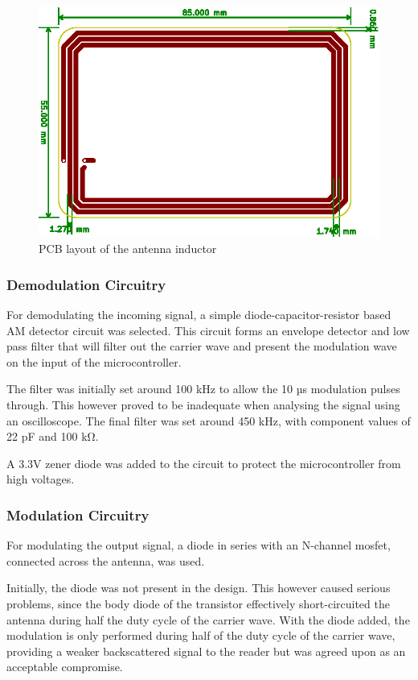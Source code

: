 \begin{figure}[h!]
    \centering
    \includegraphics[scale=1.0]{res/softtag-brd-antenna.eps}
    \caption{PCB layout of the antenna inductor}
    \label{fig:brd-antenna}
\end{figure}

\subsubsection{Demodulation Circuitry}
For demodulating the incoming signal, a simple diode-capacitor-resistor based AM detector circuit was selected.
This circuit forms an envelope detector and low pass filter that will filter out the carrier wave and present the modulation wave on the input of the microcontroller.

The filter was initially set around 100 kHz to allow the 10 µs modulation pulses\cite{rfid-iso} through.
This however proved to be inadequate when analysing the signal using an oscilloscope.
The final filter was set around 450 kHz, with component values of 22 pF and 100 kΩ.

A 3.3V zener diode was added to the circuit to protect the microcontroller from high voltages.

\subsubsection{Modulation Circuitry}
For modulating the output signal, a diode in series with an N-channel mosfet, connected across the antenna, was used.

Initially, the diode was not present in the design.
This however caused serious problems, since the body diode of the transistor effectively short-circuited the antenna during half the duty cycle of the carrier wave.
With the diode added, the modulation is only performed during half of the duty cycle of the carrier wave, providing a weaker backscattered signal to the reader but was agreed upon as an acceptable compromise.

